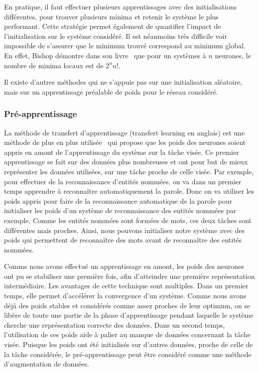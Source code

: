 En pratique, il faut effectuer plusieurs apprentissages avec des initialisations différentes, pour trouver plusieurs minima et retenir le système le plus performant. Cette stratégie permet également de quantifier l'impact de l'initialisation sur le système considéré. Il est néanmoins très difficile voir impossible de s'assurer que le minimum trouvé correspond au minimum global. En effet, Bishop démontre dans son livre~\cite{Bishop2006} que pour un systèmes à $n$ neurones, le nombre de minima locaux est de $2^n n!$.

Il existe d'autres méthodes qui ne s'appuie pas sur une initialisation aléatoire, mais sur un apprentissage préalable de poids pour le réseau considéré.

\subsubsection{Pré-apprentissage}
La méthode de transfert d'apprentissage (transfert learning en anglais) est une méthode de plus en plus utilisée~\cite{Pan2010,Weiss2016} qui propose que les poids des neurones soient appris en amont de l'apprentissage du système sur la tâche visée. Ce premier apprentissage se fait sur des données plus nombreuses et ont pour but de mieux représenter les données utilisées, sur une tâche proche de celle visée. Par exemple, pour effectuer de la reconnaissance d'entités nommées, on va dans un premier temps apprendre à reconnaître automatiquement la parole. Donc on va utiliser les poids appris pour faire de la reconnaissance automatique de la parole pour initialiser les poids d'un système de reconnaissance des entités nommées par exemple. Comme les entités nommées sont formées de mots, ces deux tâches sont différentes mais proches. Ainsi, nous pouvons initialiser notre système avec des poids qui permettent de reconnaître des mots avant de reconnaître des entités nommées.

Comme nous avons effectué un apprentissage en amont, les poids des neurones ont pu se stabiliser une première fois, afin d'atteindre une première représentation intermédiaire. Les avantages de cette technique sont multiples. Dans un premier temps, elle permet d’accélérer la convergence d'un système. Comme nous avons déjà des poids stables et considérés comme assez proches de leur optimum, on se libère de toute une partie de la phase d'apprentissage pendant laquelle le système cherche une représentation correcte des données. Dans un second temps, l'utilisation de ces poids aide à palier au manque de données concernant la tâche visée. Puisque les poids ont été initialisés sur d'autres données, proche de celle de la tâche considérée, le pré-apprentissage peut être considéré comme une méthode d'augmentation de données.

